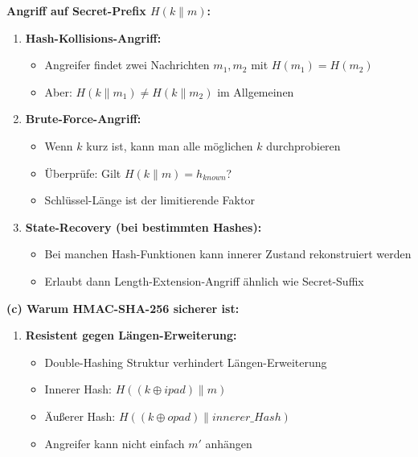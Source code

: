 \documentclass[12pt,a4paper]{article}
\begin{document}
\begin{tcolorbox}[colback=solutionbg, colframe=black!30]

\textbf{Angriff auf Secret-Prefix $H(k \| m)$:}

\begin{enumerate}[1.]
    \item \textbf{Hash-Kollisions-Angriff:}
    \begin{itemize}
        \item Angreifer findet zwei Nachrichten $m_1, m_2$ mit $H(m_1) = H(m_2)$
        \item Aber: $H(k \| m_1) \neq H(k \| m_2)$ im Allgemeinen
    \end{itemize}
    
    \item \textbf{Brute-Force-Angriff:}
    \begin{itemize}
        \item Wenn $k$ kurz ist, kann man alle möglichen $k$ durchprobieren
        \item Überprüfe: Gilt $H(k \| m) = h_{known}$?
        \item Schlüssel-Länge ist der limitierende Faktor
    \end{itemize}
    
    \item \textbf{State-Recovery (bei bestimmten Hashes):}
    \begin{itemize}
        \item Bei manchen Hash-Funktionen kann innerer Zustand rekonstruiert werden
        \item Erlaubt dann Length-Extension-Angriff ähnlich wie Secret-Suffix
    \end{itemize}
\end{enumerate}

\textbf{(c) Warum HMAC-SHA-256 sicherer ist:} \checkmark

\begin{enumerate}[1.]
    \item \textbf{Resistent gegen Längen-Erweiterung:}
    \begin{itemize}
        \item Double-Hashing Struktur verhindert Längen-Erweiterung
        \item Innerer Hash: $H((k \oplus ipad) \| m)$
        \item Äußerer Hash: $H((k \oplus opad) \| innerer\_Hash)$
        \item Angreifer kann nicht einfach $m'$ anhängen
    \end{itemize}
    

\end{enumerate}
\end{tcolorbox}
\end{document}
